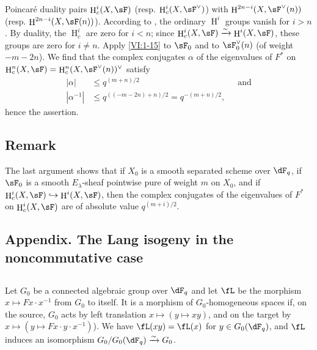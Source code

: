 \documentclass[oneside]{book}
\DeclareMathOperator{\h}{H}
\newcommand{\iso}{\xrightarrow\sim}
\theoremstyle{sga-source}
\theoremstyle{sga-source-dash}
\theoremstyle{sga-source-dotdash}
\theoremstyle{sga-source-number-note-dash}
\theoremstyle{sga-source-note-number-dotdash}
\theoremstyle{sga-source-example-dotdash}
\theoremstyle{sga-source-inline-number}
\theoremstyle{sga-source-bare-number}
\theoremstyle{sga-source}
\newcommand{\PrintPage}[1]{}\newcommand{\MathPage}[1]{}\newcommand{\PrintCite}[2]{#1}\newcommand{\var}[3]{#1}
\begin{document}
Poincaré duality pairs $\h_c^i(X,\sF)$ (resp. 
$\h_c^i(X,\sF^\vee)$) with $\h^{2n-i}(X,\sF^\vee(n))$ (resp. 
$\h^{2n-i}(X,\sF(n))$). According to \cite[XIV 3.2]{sga4}, the ordinary $\h^i$ groups 
vanish for $i>n$. By duality, the $\h_c^i$ are zero for $i<n$; since 
$\h_c^i(X,\sF) \iso \h^i(X,\sF)$, these groups are zero for $i\ne n$. 
\var{Apply \ref{VI:1-15}}{Apply \ref{VI:1-17}}{S45-SOL-0722} to $\sF_0$ and to $\sF_0^\vee(n)$ (of weight 
$-m-2n$). We find that the complex conjugates $\alpha$ of the eigenvalues 
of $F^\ast$ on $\h_c^n(X,\sF) = \h_c^n(X,\sF^\vee(n))^\vee$ satisfy 
\begin{align*}
  |\alpha| &\leqslant q^{(m+n)/2} && \text{and} \\
  |\alpha^{-1}| &\leqslant q^{((-m-2n)+n)/2} = q^{-(m+n)/2} \text{,}
\end{align*}
hence the assertion. 





\subsection{Remark}\label{VI:1-21}

The last argument shows that if $X_0$ is a smooth separated scheme over 
$\dF_q$, if $\sF_0$ is a smooth $E_\lambda$-sheaf pointwise pure of weight 
$m$ on $X_0$, and if $\h_c^i(X,\sF) \hookrightarrow \h^i(X,\sF)$, then the 
complex conjugates of the eigenvalues of $F^\ast$ on $\h_c^i(X,\sF)$ are 
of absolute value $q^{(m+i)/2}$. 





\PrintPage{181}
\subsection*{Appendix. The Lang isogeny in the noncommutative case}




\subsection{}\label{VI:1-22}

Let $G_0$ be a connected algebraic group over $\dF_q$ and let $\fL$ be the morphism 
$x\mapsto F x\cdot x^{-1}$ from $G_0$ to itself. It is a morphism of 
$G_0$-homogeneous spaces if, on the source, $G_0$ acts by left translation 
$x\mapsto (y\mapsto x y)$, and on the target by 
$x\mapsto (y\mapsto F x\cdot y\cdot x^{-1})$). We have $\fL(xy) = \fL(x)$ for 
$y\in G_0(\dF_q)$, and $\fL$ induces an isomorphism $G_0/G_0(\dF_q)\iso G_0$. 
\end{document}
